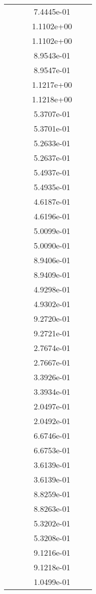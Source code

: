 \begin{xltabular}{\textwidth}{r|rS[table-format=1.3e+2]S[table-format=1.4e+2]S[table-format=1.4e+2]S[table-format=-1.5]}
&  &  & 7.4445e-01 & & \\
&  &  & 1.1102e+00 & & \\
&  &  & 1.1102e+00 & & \\
&  &  & 8.9543e-01 & & \\
&  &  & 8.9547e-01 & & \\
&  &  & 1.1217e+00 & & \\
&  &  & 1.1218e+00 & & \\
&  &  & 5.3707e-01 & & \\
&  &  & 5.3701e-01 & & \\
&  &  & 5.2633e-01 & & \\
&  &  & 5.2637e-01 & & \\
&  &  & 5.4937e-01 & & \\
&  &  & 5.4935e-01 & & \\
&  &  & 4.6187e-01 & & \\
&  &  & 4.6196e-01 & & \\
&  &  & 5.0099e-01 & & \\
&  &  & 5.0090e-01 & & \\
&  &  & 8.9406e-01 & & \\
&  &  & 8.9409e-01 & & \\
&  &  & 4.9298e-01 & & \\
&  &  & 4.9302e-01 & & \\
&  &  & 9.2720e-01 & & \\
&  &  & 9.2721e-01 & & \\
&  &  & 2.7674e-01 & & \\
&  &  & 2.7667e-01 & & \\
&  &  & 3.3926e-01 & & \\
&  &  & 3.3934e-01 & & \\
&  &  & 2.0497e-01 & & \\
&  &  & 2.0492e-01 & & \\
&  &  & 6.6746e-01 & & \\
&  &  & 6.6753e-01 & & \\
&  &  & 3.6139e-01 & & \\
&  &  & 3.6139e-01 & & \\
&  &  & 8.8259e-01 & & \\
&  &  & 8.8263e-01 & & \\
&  &  & 5.3202e-01 & & \\
&  &  & 5.3208e-01 & & \\
&  &  & 9.1216e-01 & & \\
&  &  & 9.1218e-01 & & \\
&  &  & 1.0499e-01 & & \\

\end{xltabular}
